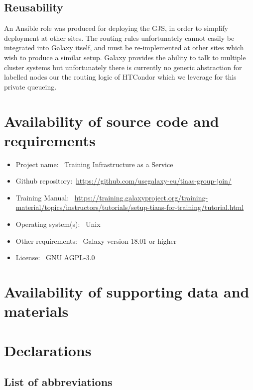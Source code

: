 \documentclass[a4paper,num-refs]{oup-contemporary}
\begin{document}
\subsection{Reusability}
An Ansible role was produced for deploying the GJS, in order to simplify deployment at other sites. The routing rules unfortunately cannot easily be integrated into Galaxy itself, and must be re-implemented at other sites which wish to produce a similar setup. Galaxy provides the ability to talk to multiple cluster systems but unfortunately there is currently no generic abstraction for labelled nodes our the routing logic of HTCondor which we leverage for this private queueing.


\section{Availability of source code and requirements}

\begin{itemize}
\item Project name: ~Training Infrastructure as a Service
\item Github repository:~\url{https://github.com/usegalaxy-eu/tiaas-group-join/}
\item Training Manual: ~\url{https://training.galaxyproject.org/training-material/topics/instructors/tutorials/setup-tiaas-for-training/tutorial.html}
\item Operating system(s): ~Unix
\item Other requirements: ~Galaxy version 18.01 or higher
\item License: ~GNU AGPL-3.0
\end{itemize}

\section{Availability of supporting data and materials}



\section{Declarations}

\subsection{List of abbreviations}
\end{document}
